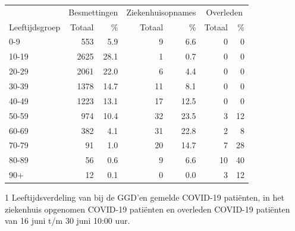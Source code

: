 \documentclass[
  english,
  man,floatsintext]{apa6}
\begin{document}
\begin{table}
\centering\begingroup\fontsize{11}{13}\selectfont

\begin{threeparttable}
\begin{tabular}{lrrrrrr}
\toprule
\multicolumn{1}{c}{ } & \multicolumn{2}{c}{Besmettingen} & \multicolumn{2}{c}{Ziekenhuisopnames} & \multicolumn{2}{c}{Overleden} \\
\cmidrule(l{3pt}r{3pt}){2-3} \cmidrule(l{3pt}r{3pt}){4-5} \cmidrule(l{3pt}r{3pt}){6-7}
Leeftijdsgroep & Totaal & \% & Totaal & \% & Totaal & \%\\
\midrule
0-9 & 553 & 5.9 & 9 & 6.6 & 0 & 0\\
10-19 & 2625 & 28.1 & 1 & 0.7 & 0 & 0\\
20-29 & 2061 & 22.0 & 6 & 4.4 & 0 & 0\\
30-39 & 1378 & 14.7 & 11 & 8.1 & 0 & 0\\
40-49 & 1223 & 13.1 & 17 & 12.5 & 0 & 0\\
50-59 & 974 & 10.4 & 32 & 23.5 & 3 & 12\\
60-69 & 382 & 4.1 & 31 & 22.8 & 2 & 8\\
70-79 & 91 & 1.0 & 20 & 14.7 & 7 & 28\\
80-89 & 56 & 0.6 & 9 & 6.6 & 10 & 40\\
90+ & 12 & 0.1 & 0 & 0.0 & 3 & 12\\
\bottomrule
\end{tabular}
\begin{tablenotes}
\item[1] Leeftijdsverdeling van bij de GGD’en gemelde COVID-19 patiënten, in het ziekenhuis opgenomen COVID-19 patiënten en overleden COVID-19 patiënten van 16 juni t/m 30 juni 10:00 uur.
\end{tablenotes}
\end{threeparttable}
\endgroup{}
\end{table}

\newpage
\end{document}
